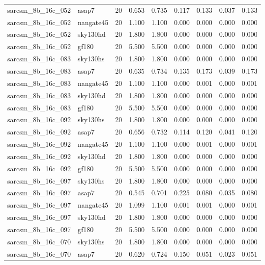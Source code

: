 \begin{tabular}{llrrrrrrr}
sarcsm\_8b\_16c\_052 & asap7 & 20 & 0.653 & 0.735 & 0.117 & 0.133 & 0.037 & 0.133 \\
sarcsm\_8b\_16c\_052 & nangate45 & 20 & 1.100 & 1.100 & 0.000 & 0.000 & 0.000 & 0.000 \\
sarcsm\_8b\_16c\_052 & sky130hd & 20 & 1.800 & 1.800 & 0.000 & 0.000 & 0.000 & 0.000 \\
sarcsm\_8b\_16c\_052 & gf180 & 20 & 5.500 & 5.500 & 0.000 & 0.000 & 0.000 & 0.000 \\
sarcsm\_8b\_16c\_083 & sky130hs & 20 & 1.800 & 1.800 & 0.000 & 0.000 & 0.000 & 0.000 \\
sarcsm\_8b\_16c\_083 & asap7 & 20 & 0.635 & 0.734 & 0.135 & 0.173 & 0.039 & 0.173 \\
sarcsm\_8b\_16c\_083 & nangate45 & 20 & 1.100 & 1.100 & 0.000 & 0.001 & 0.000 & 0.001 \\
sarcsm\_8b\_16c\_083 & sky130hd & 20 & 1.800 & 1.800 & 0.000 & 0.000 & 0.000 & 0.000 \\
sarcsm\_8b\_16c\_083 & gf180 & 20 & 5.500 & 5.500 & 0.000 & 0.000 & 0.000 & 0.000 \\
sarcsm\_8b\_16c\_092 & sky130hs & 20 & 1.800 & 1.800 & 0.000 & 0.000 & 0.000 & 0.000 \\
sarcsm\_8b\_16c\_092 & asap7 & 20 & 0.656 & 0.732 & 0.114 & 0.120 & 0.041 & 0.120 \\
sarcsm\_8b\_16c\_092 & nangate45 & 20 & 1.100 & 1.100 & 0.000 & 0.001 & 0.000 & 0.001 \\
sarcsm\_8b\_16c\_092 & sky130hd & 20 & 1.800 & 1.800 & 0.000 & 0.000 & 0.000 & 0.000 \\
sarcsm\_8b\_16c\_092 & gf180 & 20 & 5.500 & 5.500 & 0.000 & 0.000 & 0.000 & 0.000 \\
sarcsm\_8b\_16c\_097 & sky130hs & 20 & 1.800 & 1.800 & 0.000 & 0.000 & 0.000 & 0.000 \\
sarcsm\_8b\_16c\_097 & asap7 & 20 & 0.545 & 0.701 & 0.225 & 0.080 & 0.035 & 0.080 \\
sarcsm\_8b\_16c\_097 & nangate45 & 20 & 1.099 & 1.100 & 0.001 & 0.001 & 0.000 & 0.001 \\
sarcsm\_8b\_16c\_097 & sky130hd & 20 & 1.800 & 1.800 & 0.000 & 0.000 & 0.000 & 0.000 \\
sarcsm\_8b\_16c\_097 & gf180 & 20 & 5.500 & 5.500 & 0.000 & 0.000 & 0.000 & 0.000 \\
sarcsm\_8b\_16c\_070 & sky130hs & 20 & 1.800 & 1.800 & 0.000 & 0.000 & 0.000 & 0.000 \\
sarcsm\_8b\_16c\_070 & asap7 & 20 & 0.620 & 0.724 & 0.150 & 0.051 & 0.023 & 0.051 \\

\end{tabular}
